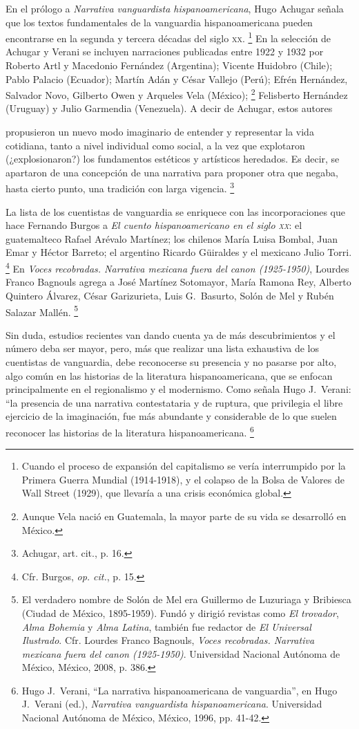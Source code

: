 \documentclass[14pt,twoside,final]{extbook} %
\let\oldfootnote\footnote
\renewcommand\footnote[1]{%
\oldfootnote{\hspace{1mm}#1}}
\begin{document}
En el prólogo a \emph{Narrativa vanguardista hispanoamericana}, Hugo Achugar señala que los textos fundamentales de la vanguardia hispanoamericana pueden encontrarse en la segunda y tercera décadas del siglo \textsc{xx}.\footnote{Cuando el proceso de expansión del capitalismo se vería interrumpido por la Primera Guerra Mundial (1914-1918), y el colapso de la Bolsa de Valores de Wall Street (1929), que llevaría a una crisis económica global.} En la selección de Achugar y Verani se incluyen narraciones publicadas entre 1922 y 1932 por Roberto Artl y Macedonio Fernández (Argentina); Vicente Huidobro (Chile); Pablo Palacio (Ecuador); Martín Adán y César Vallejo (Perú); Efrén Hernández, Salvador Novo, Gilberto Owen y Arqueles Vela (México);\footnote{Aunque Vela nació en Guatemala, la mayor parte de su vida se desarrolló en México.} Felisberto Hernández (Uruguay) y Julio Garmendia (Venezuela). A decir de Achugar, estos autores
\begin{quoting}
propusieron un nuevo modo imaginario de entender y representar la vida cotidiana, tanto a nivel individual como social, a la vez que explotaron (¿explosionaron?) los fundamentos estéticos y artísticos heredados. Es decir, se apartaron de una concepción de una narrativa para proponer otra que negaba, hasta cierto punto, una tradición con larga vigencia.\footnote{Achugar, art. cit., p. 16.}
\end{quoting}
La lista de los cuentistas de vanguardia se enriquece con las incorporaciones que hace Fernando Burgos a \emph{El cuento hispanoamericano en el siglo \textsc{xx}}: el guatemalteco Rafael Arévalo Martínez; los chilenos María Luisa Bombal, Juan Emar y Héctor Barreto; el argentino Ricardo Güiraldes y el mexicano Julio Torri.\footnote{Cfr. Burgos, \emph{op. cit.}, p. 15.} En \emph{Voces recobradas. Narrativa mexicana fuera del canon (\mbox{1925-1950})}, Lourdes Franco Bagnouls agrega a José Martínez Sotomayor, María Ramona Rey, Alberto Quintero Álvarez, César Garizurieta, Luis G.~Basurto, Solón de Mel y Rubén Salazar Mallén.\footnote{El verdadero nombre de Solón de Mel era Guillermo de Luzuriaga y Bribiesca (Ciudad de México, 1895-1959). Fundó y dirigió revistas como \emph{El trovador}, \emph{Alma Bohemia} y \emph{Alma Latina}, también fue redactor de \emph{El Universal Ilustrado}. Cfr. Lourdes Franco Bagnouls, \emph{Voces recobradas. Narrativa mexicana fuera del canon (1925-1950)}. Universidad Nacional Autónoma de México, México, 2008, p. 386.}

Sin duda, estudios recientes van dando cuenta ya de más descubrimientos y el número deba ser mayor, pero, más que realizar una lista exhaustiva de los cuentistas de vanguardia, debe reconocerse su presencia y no pasarse por alto, algo común en las historias de la literatura hispanoamericana, que se enfocan principalmente en el regionalismo y el modernismo. Como señala Hugo J.~Verani: ``la presencia de una narrativa contestataria y de ruptura, que privilegia el libre ejercicio de la imaginación, fue más abundante y considerable de lo que suelen reconocer las historias de la literatura hispanoamericana.\footnote{Hugo J.~Verani, ``La narrativa hispanoamericana de vanguardia'', en Hugo J.~Verani (ed.), \emph{Narrativa vanguardista hispanoamericana}. Universidad Nacional Autónoma de México, México, 1996, pp. 41-42.}
\end{document}
